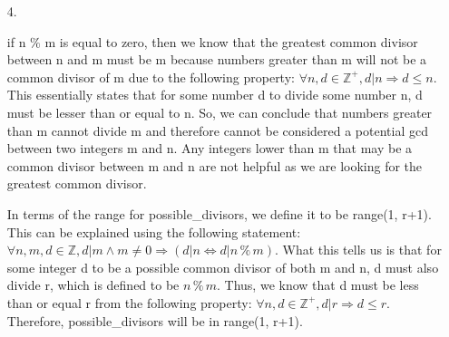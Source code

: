 \documentclass[11pt]{article}
\begin{document}
\begin{enumerate}
\begin{proof}
Part 2: $d|n \mathbin{\%} m \Rightarrow d|n$

Assume $d|n \mathbin{\%} m$. We want to show that $d|n$. \\
$d|n$ can be expressed as $\exists k_1 \in \mathbb{Z}, n = dk_{1}$ \\
$d|n \mathbin{\%} m$ can be expressed as $\exists k_2 \in \mathbb{Z}$, $n \mathbin{\%} m = dk_{2}$ \\
Lastly, we assumed from the very beginning that $d|m$, which can be expressed as $\exists k_3 \in \mathbb{Z}, m = dk_{3}$\\
From part one of the proof, we know that $n = qm + n \mathbin{\%} m$. This can now be rewritten as $n = qdk_3 + dk_2$. \\
$n = d(qk_3+k_2)$. Now, we know that $qk_3+k_2$ will produce some integer because $q, k_3, k_2$ are all defined to be integers. Let $(qk_3+k_2)$ = $k_1$. Now, we can write that $n = dk_1$, which is what we wanted to originally show.\\  

Therefore, since we've proven $d|n \Rightarrow d|n \mathbin{\%} m$ and $d|n \mathbin{\%} m \Rightarrow d|n$, we can conclude that the biconditional conclusion of the original statement is true, thus proving the whole original statement to be true. 


\end{proof}

\item[4.]

if n $\mathbin{\%}$ m is equal to zero, then we know that the greatest common divisor between n and m must be m because numbers greater than m will not be a common divisor of m due to the following property: $\forall n, d\in \mathbb{Z}^{+}, d|n \Rightarrow d \le n$. This essentially states that for some number d to divide some number n, d must be lesser than or equal to n. So, we can conclude that numbers greater than m cannot divide m and therefore cannot be considered a potential gcd between two integers m and n. Any integers lower than m that may be a common divisor between m and n are not helpful as we are looking for the greatest common divisor. 


In terms of the range for possible\_divisors, we define it to be range(1, r+1). This can be explained using the following statement: $\forall n, m, d\in \mathbb{Z}, d|m \land m \ne 0 \Rightarrow (d|n \iff d|n \mathbin{\%} m)$. What this tells us is that for some integer d to be a possible common divisor of both m and n, d must also divide r, which is defined to be $n \mathbin{\%} m$. Thus, we know that d must be less than or equal r from the following property: $\forall n, d\in \mathbb{Z}^{+}, d|r \Rightarrow d \le r$. Therefore, possible\_divisors will be in range(1, r+1). 


\end{enumerate}
\end{document}

